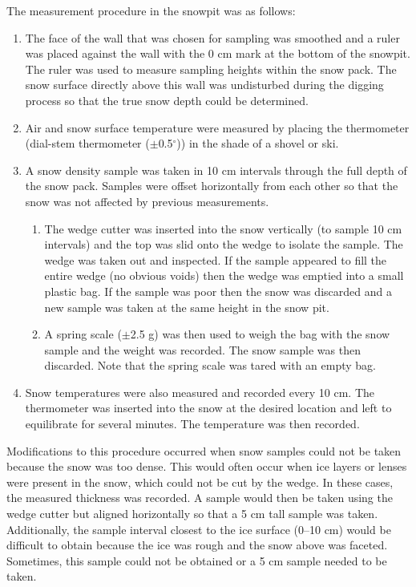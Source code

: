 \documentclass[12pt]{article}
\begin{document}
The measurement procedure in the snowpit was as follows:
\begin{enumerate}
\item The face of the wall that was chosen for sampling was smoothed and a ruler was placed against the wall with the 0 cm mark at the bottom of the snowpit. The ruler was used to measure sampling heights within the snow pack. The snow surface directly above this wall was undisturbed during the digging process so that the true snow depth could be determined. 
\item Air and snow surface temperature were measured by placing the thermometer (dial-stem thermometer ($\pm$0.5$^\circ$)) in the shade of a shovel or ski. 
\item A snow density sample was taken in 10 cm intervals through the full depth of the snow pack. Samples were offset horizontally from each other so that the snow was not affected by previous measurements. 
	\begin{enumerate}
	\item The wedge cutter was inserted into the snow vertically (to sample 10 cm intervals) and the top was slid onto the wedge to isolate the sample. The wedge was taken out and inspected. If the sample appeared to fill the entire wedge (no obvious voids) then the wedge was emptied into a small plastic bag. If the sample was poor then the snow was discarded and a new sample was taken at the same height in the snow pit. 
	\item A spring scale ($\pm$2.5 g) was then used to weigh the bag with the snow sample and the weight was recorded. The snow sample was then discarded. Note that the spring scale was tared with an empty bag.
	\end{enumerate}
\item Snow temperatures were also measured and recorded every 10 cm. The thermometer was inserted into the snow at the desired location and left to equilibrate for several minutes. The temperature was then recorded.
\end{enumerate}

Modifications to this procedure occurred when snow samples could not be taken because the snow was too dense. This would often occur when ice layers or lenses were present in the snow, which could not be cut by the wedge. In these cases, the measured thickness was recorded. A sample would then be taken using the wedge cutter but aligned horizontally so that a 5 cm tall sample was taken. Additionally, the sample interval closest to the ice surface (0--10 cm) would be difficult to obtain because the ice was rough and the snow above was faceted. Sometimes, this sample could not be obtained or a 5 cm sample needed to be taken. 
\end{document}
